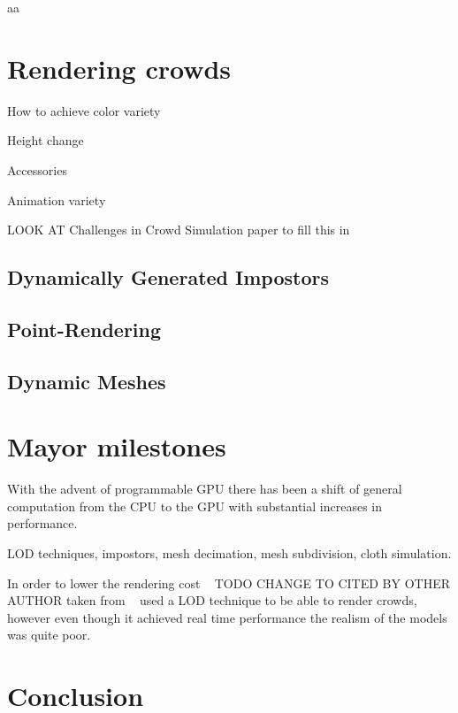 \documentclass[11pt,twocolumn]{article}
\numberwithin{equation}{section} %
\numberwithin{figure}{section} %
\numberwithin{table}{section} %
\begin{document}
aa

\section{Rendering crowds}

How to achieve color variety

Height change

Accessories 

Animation variety

LOOK AT Challenges in Crowd Simulation paper to fill this in

\subsection{Dynamically Generated Impostors}
\subsection{Point-Rendering}
\subsection{Dynamic Meshes}

\section{Mayor milestones}

With the advent of programmable GPU there has been a shift of general computation from the CPU to the GPU with substantial increases in performance.

LOD techniques, impostors, mesh decimation, mesh subdivision, cloth simulation.

In order to lower the rendering cost ~\cite{pratt1997humans} TODO CHANGE TO CITED BY OTHER AUTHOR taken from ~\cite{Aubel1999} used a LOD technique to be able to render crowds, however even though it  achieved real time performance the realism of the models was quite poor.



\section{Conclusion}

%


\end{document}
